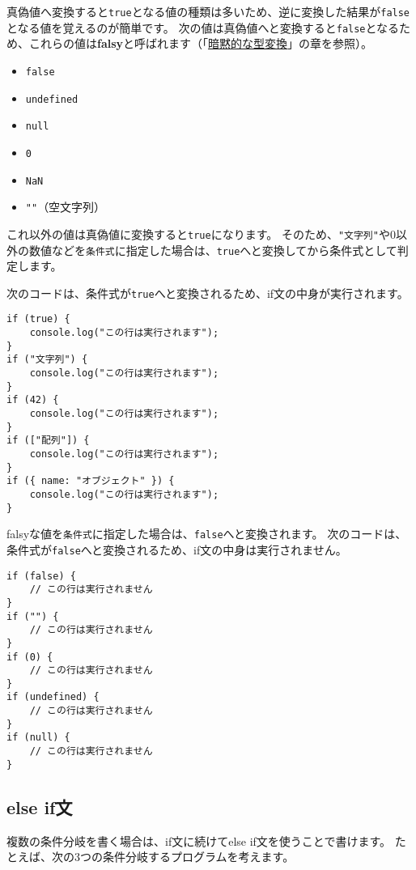 真偽値へ変換すると\texttt{true}となる値の種類は多いため、逆に変換した結果が\texttt{false}となる値を覚えるのが簡単です。
次の値は真偽値へと変換すると\texttt{false}となるため、これらの値は\textbf{falsy}と呼ばれます（「\href{../implicit-coercion/README.md}{暗黙的な型変換}」の章を参照）。

\begin{itemize}
\item
  \texttt{false}
\item
  \texttt{undefined}
\item
  \texttt{null}
\item
  \texttt{0}
\item
  \texttt{NaN}
\item
  \texttt{""}（空文字列）
\end{itemize}

これ以外の値は真偽値に変換すると\texttt{true}になります。
そのため、\texttt{"文字列"}や0以外の数値などを\texttt{条件式}に指定した場合は、\texttt{true}へと変換してから条件式として判定します。

次のコードは、条件式が\texttt{true}へと変換されるため、if文の中身が実行されます。

\begin{lstlisting}
if (true) {
    console.log("この行は実行されます"); 
}
if ("文字列") {
    console.log("この行は実行されます");
}
if (42) {
    console.log("この行は実行されます");
}
if (["配列"]) {
    console.log("この行は実行されます");
}
if ({ name: "オブジェクト" }) {
    console.log("この行は実行されます");
}
\end{lstlisting}

falsyな値を\texttt{条件式}に指定した場合は、\texttt{false}へと変換されます。
次のコードは、条件式が\texttt{false}へと変換されるため、if文の中身は実行されません。

\begin{lstlisting}
if (false) {
    // この行は実行されません
}
if ("") {
    // この行は実行されません
}
if (0) {
    // この行は実行されません
}
if (undefined) {
    // この行は実行されません
}
if (null) {
    // この行は実行されません
}
\end{lstlisting}

\hypertarget{else-if-statement}{%
\subsection{else if文}\label{else-if-statement}}

複数の条件分岐を書く場合は、if文に続けてelse if文を使うことで書けます。
たとえば、次の3つの条件分岐するプログラムを考えます。

